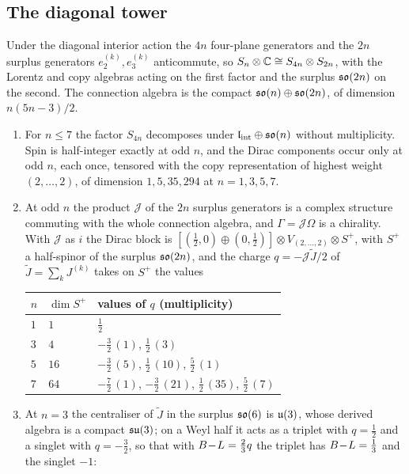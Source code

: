 \subsection{The diagonal tower}

Under the diagonal interior action the $4n$ four-plane generators and the $2n$ surplus generators $e^{(k)}_2,e^{(k)}_3$ anticommute, so
$S_n\otimes\mathbb{C}\cong S_{4n}\otimes S_{2n}$, with the Lorentz and copy algebras acting on the first factor and the surplus $\mathfrak{so}(2n)$ on the second. The
connection algebra is the compact $\mathfrak{so}(n)\oplus\mathfrak{so}(2n)$, of dimension $n(5n-3)/2$.

\begin{proposition}
\label{prop:diagtower}
\begin{enumerate}[label=(\roman*),leftmargin=2.2em]
\item For $n\le7$ the factor $S_{4n}$ decomposes under $\mathfrak l_{\rm int}\oplus\mathfrak{so}(n)$ without multiplicity. Spin is half-integer exactly at odd $n$, and the Dirac
components occur only at odd $n$, each once, tensored with the copy representation of highest weight $(2,\dots,2)$, of dimension $1,5,35,294$ at
$n=1,3,5,7$.
\item At odd $n$ the product $\mathcal J$ of the $2n$ surplus generators is a complex structure commuting with the whole connection algebra, and
$\Gamma=\mathcal J\Omega$ is a chirality. With $\mathcal J$ as $i$ the Dirac block is $[(\tfrac12,0)\oplus(0,\tfrac12)]\otimes V_{(2,\dots,2)}\otimes S^+$,
with $S^+$ a half-spinor of the surplus $\mathfrak{so}(2n)$, and the charge $q=-\mathcal J\tilde J/2$ of $\tilde J=\sum_kJ^{(k)}$ takes on $S^+$ the values
\begin{center}
\begin{tabular}{@{}lll@{}}
\toprule
$n$ & $\dim S^+$ & values of $q$ (multiplicity)\\
\midrule
$1$ & $1$ & $\tfrac12$\\
$3$ & $4$ & $-\tfrac32\,(1)$, $\tfrac12\,(3)$\\
$5$ & $16$ & $-\tfrac32\,(5)$, $\tfrac12\,(10)$, $\tfrac52\,(1)$\\
$7$ & $64$ & $-\tfrac72\,(1)$, $-\tfrac32\,(21)$, $\tfrac12\,(35)$, $\tfrac52\,(7)$\\
\bottomrule
\end{tabular}
\end{center}
\item At $n=3$ the centraliser of $\tilde J$ in the surplus $\mathfrak{so}(6)$ is $\mathfrak{u}(3)$, whose derived algebra is a compact $\mathfrak{su}(3)$; on a Weyl half it acts as
a triplet with $q=\tfrac12$ and a singlet with $q=-\tfrac32$, so that with $B\!-\!L=\tfrac23q$ the triplet has $B\!-\!L=\tfrac13$ and the singlet $-1$:

\end{enumerate}
\end{proposition}
